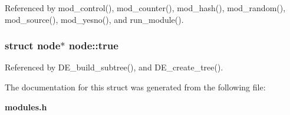 Referenced by mod\_\-control(), mod\_\-counter(), mod\_\-hash(), mod\_\-random(), mod\_\-source(), mod\_\-yesno(), and run\_\-module().
\subsubsection[{true}]{\setlength{\rightskip}{0pt plus 5cm}struct {\bf node}$\ast$ {\bf node::true}\hspace{0.3cm}{\tt  [read]}}\label{structnode_ae8a7b84aab231f0ee1a203ab7287baf}




Referenced by DE\_\-build\_\-subtree(), and DE\_\-create\_\-tree().

The documentation for this struct was generated from the following file:\begin{CompactItemize}
\item 
{\bf modules.h}\end{CompactItemize}
